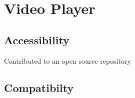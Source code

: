 \chapter{Video Player} \label{Chapter: Video Player}
\section{Accessibility} \label{Section:Accessibility}
Contributed to an open source repository
\section{Compatibilty} \label{Section: Compatibility}